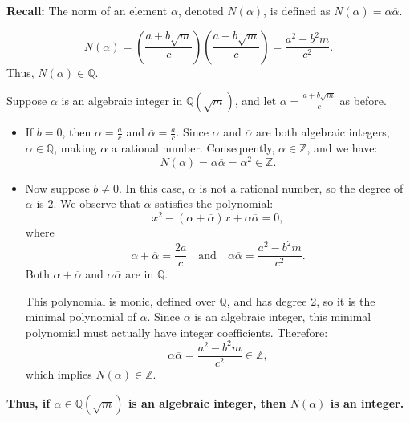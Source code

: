 \documentclass{article}
\begin{document}
\noindent \textbf{Recall:} The norm of an element \( \alpha \), denoted \( N(\alpha) \), is defined as \( N(\alpha) = \alpha \overline{\alpha} \).

\[
N(\alpha) = \left( \frac{a + b\sqrt{m}}{c} \right) \left( \frac{a - b\sqrt{m}}{c} \right) = \frac{a^2 - b^2m}{c^2}.
\]
Thus, \( N(\alpha) \in \mathbb{Q} \).

\vspace{0.5em}

Suppose \( \alpha \) is an algebraic integer in \( \mathbb{Q}(\sqrt{m}) \), and let \( \alpha = \frac{a + b\sqrt{m}}{c} \) as before.

\begin{itemize}
    \item If \( b = 0 \), then \( \alpha = \frac{a}{c} \) and \( \overline{\alpha} = \frac{a}{c} \). Since \( \alpha \) and \( \overline{\alpha} \) are both algebraic integers, \( \alpha \in \mathbb{Q} \), making \( \alpha \) a rational number. Consequently, \( \alpha \in \mathbb{Z} \), and we have:
    \[
    N(\alpha) = \alpha \overline{\alpha} = \alpha^2 \in \mathbb{Z}.
    \]

    \item Now suppose \( b \neq 0 \). In this case, \( \alpha \) is not a rational number, so the degree of \( \alpha \) is 2. We observe that \( \alpha \) satisfies the polynomial:
    \[
    x^2 - (\alpha + \overline{\alpha})x + \alpha \overline{\alpha} = 0,
    \]
    where
    \[
    \alpha + \overline{\alpha} = \frac{2a}{c} \quad \text{and} \quad \alpha \overline{\alpha} = \frac{a^2 - b^2m}{c^2}.
    \]
    Both \( \alpha + \overline{\alpha} \) and \( \alpha \overline{\alpha} \) are in \( \mathbb{Q} \).

    This polynomial is monic, defined over \( \mathbb{Q} \), and has degree 2, so it is the minimal polynomial of \( \alpha \). Since \( \alpha \) is an algebraic integer, this minimal polynomial must actually have integer coefficients. Therefore:
    \[
    \alpha \overline{\alpha} = \frac{a^2 - b^2m}{c^2} \in \mathbb{Z},
    \]
    which implies \( N(\alpha) \in \mathbb{Z} \).
\end{itemize}

\noindent \textbf{Thus, if \( \alpha \in \mathbb{Q}(\sqrt{m}) \) is an algebraic integer, then \( N(\alpha) \) is an integer.}
\end{document}
